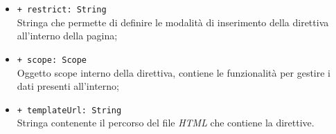 \begin{itemize}
\begin{itemize}
		\item \texttt{+ restrict: String} \\ Stringa che permette di definire le modalità di inserimento della direttiva all'interno della pagina;
		\item \texttt{+ scope: Scope} \\ Oggetto scope interno della direttiva, contiene le funzionalità per gestire i dati presenti all'interno;
		\item \texttt{+ templateUrl: String} \\ Stringa contenente il percorso del file \textit{HTML} che contiene la direttive.
	\end{itemize}
\end{itemize}